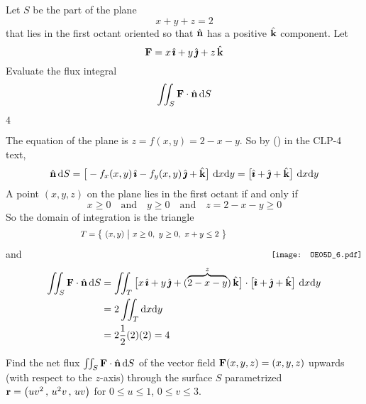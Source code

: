 \begin{question}[M317 2005D] %
Let $S$ be the part of the plane
\begin{equation*}
x + y + z =2
\end{equation*}
that lies in the first octant oriented so that $\hat{\mathbf{n}}$ has a positive 
$\hat{\mathbf{k}}$ component. Let
\begin{equation*}
\mathbf{F} = x\,\hat{\pmb{\imath}} + y\,\hat{\pmb{\jmath}} + z\,\hat{\mathbf{k}}
\end{equation*}
Evaluate the flux integral
\begin{equation*}
\iint_S \mathbf{F}\cdot\hat{\mathbf{n}}\, \mathrm{d}S
\end{equation*}
\end{question}

%

\begin{answer} 
$4$
\end{answer}

\begin{solution}
The equation of the plane is $z=f(x,y) = 2-x-y$. So by
() in the CLP-4 text,
\begin{equation*}
\hat{\mathbf{n}}\,\mathrm{d}S = \big[-f_x(x,y)\,\hat{\pmb{\imath}} - f_y(x,y)\,\hat{\pmb{\jmath}} + \hat{\mathbf{k}}\big]\ \mathrm{d}x\mathrm{d}y
             = \big[\hat{\pmb{\imath}} + \hat{\pmb{\jmath}} + \hat{\mathbf{k}}\big]\ \mathrm{d}x\mathrm{d}y
\end{equation*}
A point $(x,y,z)$ on the plane lies in the first octant if and only if
\begin{equation*}
x\ge 0\quad\text{and}\quad
y\ge 0\quad\text{and}\quad
z=2-x-y\ge 0
\end{equation*}
So the domain of integration is the triangle
\begin{equation*}
\hskip1.25in T = \Set{(x,y)}{x\ge 0,\ y\ge 0,\ x+y\le 2} \hskip0.75in
\raisebox{-25pt}[0pt][5pt]{\texttt{[image: OE05D\_6.pdf]}}
\end{equation*}
and
\begin{align*}
\iint_S \mathbf{F}\cdot\hat{\mathbf{n}}\, \mathrm{d}S
&=\iint_T \big[x\,\hat{\pmb{\imath}}+y\,\hat{\pmb{\jmath}} +(\overbrace{2-x-y}^{z})\,\hat{\mathbf{k}}\big]
         \cdot\big[\hat{\pmb{\imath}} + \hat{\pmb{\jmath}} + \hat{\mathbf{k}}\big]\ \mathrm{d}x\mathrm{d}y \\
& = 2 \iint_T \mathrm{d}x\mathrm{d}y \\
& = 2 \frac{1}{2}(2)(2) = 4
\end{align*}

\end{solution}

\begin{question}[M317 2005A] %
Find the net flux $\iint_S \mathbf{F}\cdot\hat{\mathbf{n}}\,\mathrm{d}S$ of the vector field
$\mathbf{F}(x,y,z) = (x,y,z)$ upwards (with respect to the $z$-axis) through
the surface $S$ parametrized $\mathbf{r} = \big(uv^2\,,\,u^2v\,,\,uv\big)$
for $0\le u\le 1$, $0\le v\le 3$.
\end{question}

